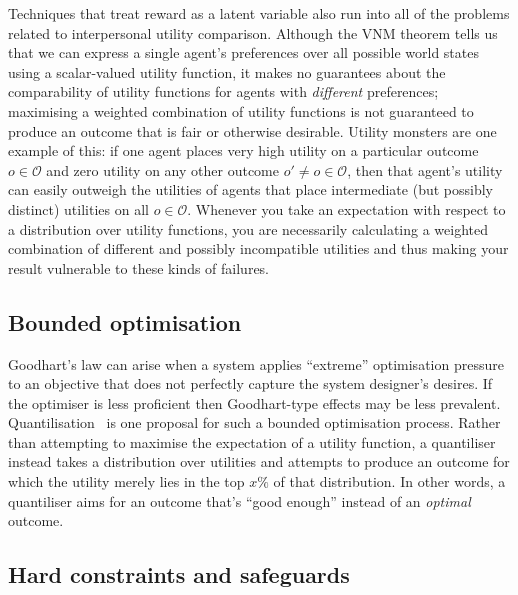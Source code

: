 \documentclass[11pt]{article}
\begin{document}
Techniques that treat reward as a latent variable also run into all of the
problems related to interpersonal utility comparison.
%
Although the VNM theorem tells us that we can express a single agent's
preferences over all possible world states using a scalar-valued utility
function, it makes no guarantees about the comparability of utility functions
for agents with \textit{different} preferences; maximising a weighted
combination of utility functions is not guaranteed to produce an outcome that is
fair or otherwise desirable.
%
Utility monsters are one example of this: if one agent places very high utility
on a particular outcome $o \in \mathcal O$ and zero utility on any other outcome
$o' \neq o \in \mathcal O$, then that agent's utility can easily outweigh the
utilities of agents that place intermediate (but possibly distinct) utilities on
all $o \in \mathcal O$.
%
Whenever you take an expectation with respect to a distribution over utility
functions, you are necessarily calculating a weighted combination of different
and possibly incompatible utilities and thus making your result vulnerable to
these kinds of failures.

\subsection{Bounded optimisation}


Goodhart's law can arise when a system applies ``extreme'' optimisation pressure
to an objective that does not perfectly capture the system designer's desires.
%
If the optimiser is less proficient then Goodhart-type effects may be less
prevalent.
%
Quantilisation~\cite{taylor16quantilizers} is one proposal for such a bounded
optimisation process.
%
Rather than attempting to maximise the expectation of a utility function, a
quantiliser instead takes a distribution over utilities and attempts to produce
an outcome for which the utility merely lies in the top $x\%$ of that
distribution.
%
In other words, a quantiliser aims for an outcome that's ``good enough'' instead
of an \textit{optimal} outcome.

\subsection{Hard constraints and safeguards}
\end{document}
